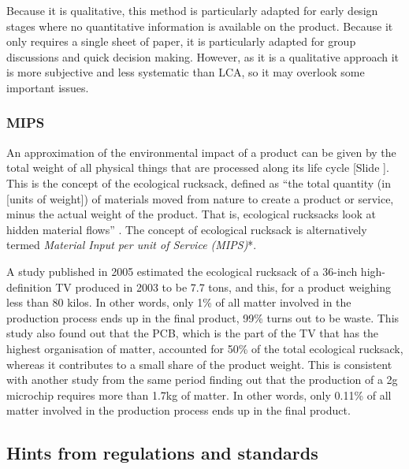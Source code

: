 \documentclass{article}
\newcounter{slide}
\begin{document}
Because it is qualitative, this method is particularly adapted for early design stages where no quantitative information is available on the product. Because it only requires a single sheet of paper, it is particularly adapted for group discussions and quick decision making. However, as it is a qualitative approach it is more subjective and less systematic than LCA, so it may overlook some important issues.

\subsubsection{MIPS}
\label{sec:mips}

An approximation of the environmental impact of a product can be given by the total weight of all physical things that are processed along its life cycle {\color{blue}[Slide ]}. This is the concept of the ecological rucksack, defined as ``the total quantity (in [units of weight]) of materials moved from nature to create a product or service, minus the actual weight of the product. That is, ecological rucksacks look at hidden material flows'' \cite{SustainabilityConceptsEcological}. The concept of ecological rucksack is alternatively termed \emph{Material Input per unit of Service (MIPS)}*.

A study published in 2005 \cite{aoeEcologicalRucksackHighDefinition2005} estimated the ecological rucksack of a 36-inch high-definition TV produced in 2003 to be 7.7 tons, and this, for a product weighing less than 80 kilos. In other words, only 1\% of all matter involved in the production process ends up in the final product, 99\% turns out to be waste. This study also found out that the PCB, which is the part of the TV that has the highest organisation of matter, accounted for 50\% of the total ecological rucksack, whereas it contributes to a small share of the product weight. This is consistent with another study from the same period \cite{williamsKilogramMicrochipEnergy2002} finding out that the production of a 2g microchip requires more than 1.7kg of matter. In other words, only 0.11\% of all matter involved in the production process ends up in the final product.

\subsection{Hints from regulations and standards}
\label{sec:standards}
\end{document}
